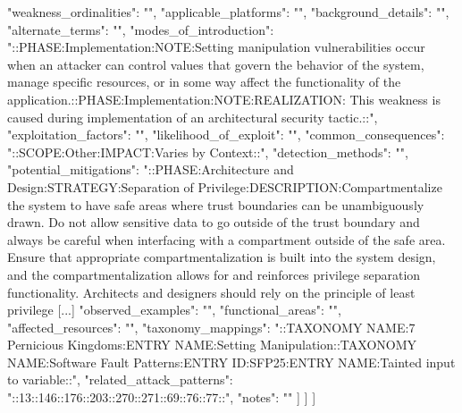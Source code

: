 \begin{code}
{{{{{        "weakness_ordinalities": "",
        "applicable_platforms": "",
        "background_details": "",
        "alternate_terms": "",
        "modes_of_introduction": "::PHASE:Implementation:NOTE:Setting manipulation vulnerabilities occur when an attacker can control values that govern the behavior of the system, manage specific resources, or in some way affect the functionality of the application.::PHASE:Implementation:NOTE:REALIZATION: This weakness is caused during implementation of an architectural security tactic.::",
        "exploitation_factors": "",
        "likelihood_of_exploit": "",
        "common_consequences": "::SCOPE:Other:IMPACT:Varies by Context::",
        "detection_methods": "",
        "potential_mitigations": "::PHASE:Architecture and Design:STRATEGY:Separation of Privilege:DESCRIPTION:Compartmentalize the system to have safe areas where trust boundaries can be unambiguously drawn. Do not allow sensitive data to go outside of the trust boundary and always be careful when interfacing with a compartment outside of the safe area. Ensure that appropriate compartmentalization is built into the system design, and the compartmentalization allows for and reinforces privilege separation functionality. Architects and designers should rely on the principle of least privilege [...]
        "observed_examples": "",
        "functional_areas": "",
        "affected_resources": "",
        "taxonomy_mappings": "::TAXONOMY NAME:7 Pernicious Kingdoms:ENTRY NAME:Setting Manipulation::TAXONOMY NAME:Software Fault Patterns:ENTRY ID:SFP25:ENTRY NAME:Tainted input to variable::",
        "related_attack_patterns": "::13::146::176::203::270::271::69::76::77::",
        "notes": ""
       }
      }
     ]
    }
   ]
  }
 ]
}   
\end{code}
